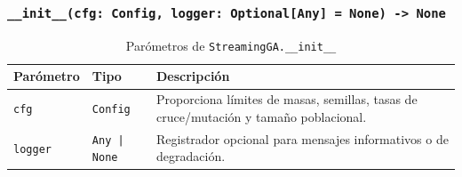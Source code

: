 \subsubsection*{\texttt{\_\_init\_\_(cfg:\ Config, logger:\ Optional[Any] = None) -> None}}

\begin{table}[H]
  \centering
  \caption{Parómetros de \texttt{StreamingGA.\_\_init\_\_}}
  \small
  \begin{tabularx}{\textwidth}{@{}p{}p{}X@{}}
    \toprule
    \textbf{Parómetro} & \textbf{Tipo} & \textbf{Descripción} \\
    \midrule
    \texttt{cfg} & \texttt{Config} & Proporciona límites de masas, semillas, tasas de cruce/mutación y tamaño poblacional. \\
    \texttt{logger} & \texttt{Any | None} & Registrador opcional para mensajes informativos o de degradación. \\
    \bottomrule
  \end{tabularx}
\end{table}

